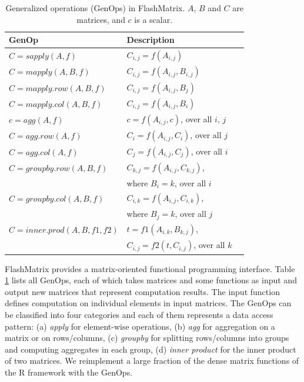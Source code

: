 \begin{table}
\begin{center}
\footnotesize
\begin{tabular}{|l|l|l|}
\hline
GenOp & Description \\
\hline
$C=sapply(A, f)$ & $C_{i,j}=f(A_{i,j})$ \\
\hline
$C=mapply(A, B, f)$ & $C_{i,j}=f(A_{i,j}, B_{i,j})$ \\
\hline
$C=mapply.row(A, B, f)$ & $C_{i,j}=f(A_{i,j}, B_j)$ \\
\hline
$C=mapply.col(A, B, f)$ & $C_{i,j}=f(A_{i,j}, B_i)$ \\
\hline
$c=agg(A, f)$ & $c=f(A_{i,j}, c)$, over all $i$, $j$ \\
\hline
$C=agg.row(A, f)$ & $C_i=f(A_{i,j}, C_i)$, over all $j$ \\
\hline
$C=agg.col(A, f)$ & $C_j=f(A_{i,j}, C_j)$, over all $i$ \\
\hline
$C=groupby.row(A, B, f)$ & $C_{k,j}=f(A_{i,j}, C_{k,j})$,\\ & where $B_i=k$, over all $i$ \\
\hline
$C=groupby.col(A, B, f)$ & $C_{i,k}=f(A_{i,j}, C_{i,k})$,\\ & where $B_j=k$, over all $j$ \\
\hline
$C=inner.prod(A, B, f1, f2)$ & $t=f1(A_{i,k}, B_{k,j})$,
\\ & $C_{i,j}=f2(t, C_{i,j})$, over all $k$ \\
\hline
\end{tabular}
\normalsize
\end{center}
\vspace{-12pt}
\caption{Generalized operations (GenOps) in FlashMatrix.
$A$, $B$ and $C$ are matrices, and $c$ is a scalar.}
\label{tbl:genops}
\vspace{-10pt}
\end{table}

FlashMatrix provides a matrix-oriented functional programming interface.
Table \ref{tbl:genops} lists all GenOps, each of which takes matrices and
some functions as input and output new matrices that represent computation results.
The input function defines computation on individual elements in input matrices.
The GenOps can be classified into four categories and each of them represents
a data access pattern: (a) \textit{apply} for
element-wise operations, (b) \textit{agg} for aggregation on a matrix
or on rows/columns, (c) \textit{groupby} for splitting rows/columns
into groups and computing aggregates in each group,
(d) \textit{inner product} for the inner product of two matrices.
We reimplement a large fraction of the dense matrix functions of
the R framework with the GenOps.

